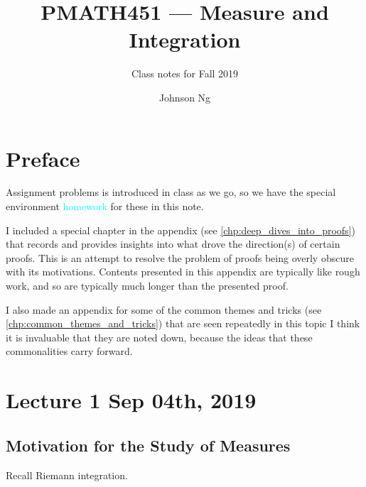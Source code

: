 \documentclass[notoc,notitlepage]{tufte-book}
\title{PMATH451 --- Measure and Integration}
\author{Johnson Ng}
\subtitle{Class notes for Fall 2019}
\begin{document}

\clearpage
\begin{fullwidth}
  \renewcommand{\listtheoremname}{\textsl{List of Homework}}
  \listoftheorems[ignoreall, show={homework}]
\end{fullwidth}

\chapter*{Preface}%
\label{chp:preface}

Assignment problems is introduced in class as we go,
so we have the special environment \textcolor{cyan}{homework}
for these in this note.

I included a special chapter in the appendix (see
\cref{chp:deep_dives_into_proofs}) that records and provides
insights into what drove the direction(s) of certain proofs.
This is an attempt to resolve the problem of proofs
being overly obscure with its motivations.
Contents presented in this appendix are typically like rough work,
and so are typically much longer than the presented proof.

I also made an appendix for some of the common themes and tricks
(see \cref{chp:common_themes_and_tricks})
that are seen repeatedly in this topic
I think it is invaluable that they are noted down, because the ideas
that these commonalities carry forward.


\chapter{Lecture 1 Sep 04th, 2019}%
\label{chp:lecture_1_sep_04th_2019}

\section{Motivation for the Study of Measures}%
\label{sec:motivation_for_the_study_of_measures}

Recall Riemann integration.
\end{document}
